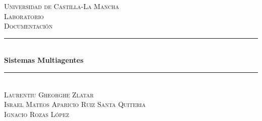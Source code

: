 \documentclass[11pt,a4paper]{article}
\begin{document}


\begin{titlepage} %
	\newcommand{\HRule}{\rule{\linewidth}{0.5mm}} %
	
	\center %
	
	
	\textsc{\LARGE Universidad de Castilla-La Mancha}\\[1.5cm] %
	
	\textsc{\Large Laboratorio}\\[0.5cm] %
	
	\textsc{\large Documentación}\\[0.5cm] %
	
	
	\HRule\\[0.4cm]
	
	{\huge\bfseries Sistemas Multiagentes}\\[0.4cm] %
	
	\HRule\\[1.5cm]
	

    \textsc{Laurentiu Gheorghe Zlatar}\\
    \textsc{Israel Mateos Aparicio Ruiz Santa Quiteria}\\
    \textsc{Ignacio Rozas López}
	
	
	

\end{titlepage}
\end{document}
